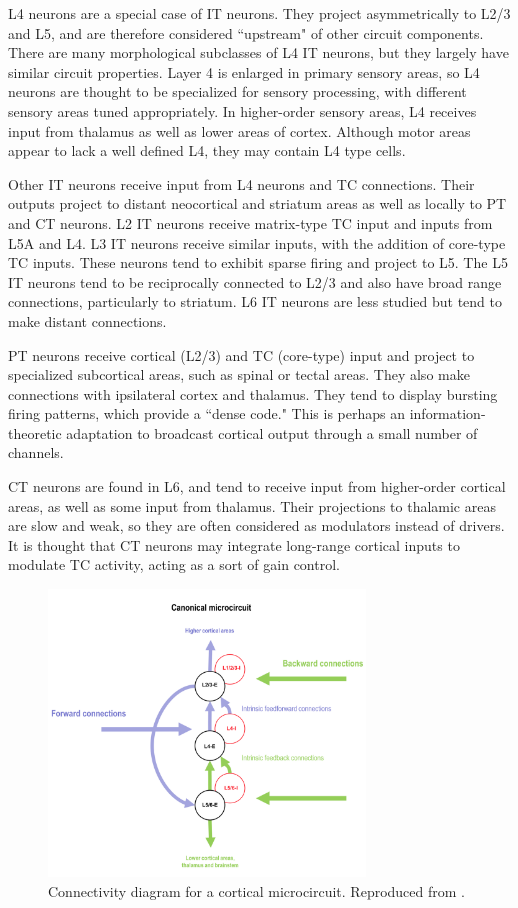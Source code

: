 L4 neurons are a special case of IT neurons. They project asymmetrically to L2/3 and L5, and are therefore considered ``upstream" of other circuit components. There are many morphological subclasses of L4 IT neurons, but they largely have similar circuit properties. Layer 4 is enlarged in primary sensory areas, so L4 neurons are thought to be specialized for sensory processing, with different sensory areas tuned appropriately. In higher-order sensory areas, L4 receives input from thalamus as well as lower areas of cortex. Although motor areas appear to lack a well defined L4, they may contain L4 type cells. 

Other IT neurons receive input from L4 neurons and TC connections. Their outputs project to distant neocortical and striatum areas as well as locally to PT and CT neurons. L2 IT neurons receive matrix-type TC input and inputs from L5A and L4. L3 IT neurons receive similar inputs, with the addition of core-type TC inputs. These neurons tend to exhibit sparse firing and project to L5. The L5 IT neurons tend to be reciprocally connected to L2/3 and also have broad range connections, particularly to striatum. L6 IT neurons are less studied but tend to make distant connections. 

PT neurons receive cortical (L2/3) and TC (core-type) input and project to specialized subcortical areas, such as spinal or tectal areas. They also make connections with ipsilateral cortex and thalamus. They tend to display bursting firing patterns, which provide a ``dense code." This is perhaps an information-theoretic adaptation to broadcast cortical output through a small number of channels. 

CT neurons are found in L6, and tend to receive input from higher-order cortical areas, as well as some input from thalamus. Their projections to thalamic areas are slow and weak, so they are often considered as modulators instead of drivers. It is thought that CT neurons may integrate long-range cortical inputs to modulate TC activity, acting as a sort of gain control. 

\begin{figure}[h]
    \centering
    \includegraphics[width=0.75\textwidth]{images/neuroscience/pc_connectivity.png}
    \caption{Connectivity diagram for a cortical microcircuit. Reproduced from \cite{bastos2012canonical}.}
    \label{fig: pc connectivity}
\end{figure}

